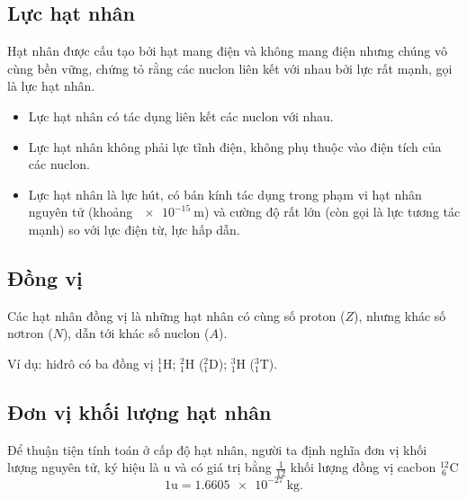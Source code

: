 \subsection{Lực hạt nhân}
Hạt nhân được cấu tạo bởi hạt mang điện và không mang điện nhưng chúng vô cùng bền vững,
chứng tỏ rằng các nuclon liên kết với nhau bởi lực rất mạnh, gọi là lực hạt nhân.
\begin{itemize}
	\item Lực hạt nhân có tác dụng liên kết các nuclon với nhau.
	\item Lực hạt nhân không phải lực tĩnh điện, không phụ thuộc vào điện tích của các nuclon.
	\item Lực hạt nhân là lực hút, có bán kính tác dụng trong phạm vi hạt nhân nguyên tử (khoảng $\SI{e-15}{\meter}$) và cường độ rất lớn (còn gọi là lực tương tác mạnh) so với lực điện từ, lực hấp dẫn.
\end{itemize}

\subsection{Đồng vị}
Các hạt nhân đồng vị là những hạt nhân có cùng số proton ($Z$), nhưng khác số nơtron ($N$), dẫn tới khác số nuclon ($A$).

Ví dụ: hiđrô có ba đồng vị $^1_1\text{H}$; $^2_1\text{H}$ ($^2_1\text{D}$); $^3_1\text{H}$ ($^3_1\text{T}$).

\subsection{Đơn vị khối lượng hạt nhân}
Để thuận tiện tính toán ở cấp độ hạt nhân, người ta định nghĩa đơn vị khối lượng nguyên tử, ký hiệu là u và có giá trị bằng $\frac{1}{12}$ khối lượng đồng vị cacbon $^{12}_{\ 6}\text{C}$
\begin{equation}
	1\text{u}=\SI{1,6605e-27}{\kilogram}.
\end{equation}
